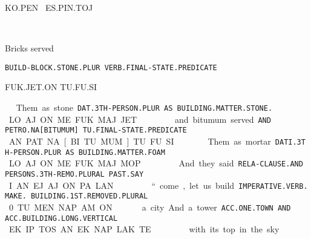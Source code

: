 {KO.PEN~    ES.PIN.TOJ				 

\ko\pen~\es\pin\toj
\drie

Bricks 				served 				 

{\tt BUILD-BLOCK.STONE.PLUR          VERB.FINAL-STATE.PREDICATE	 }

FUK.JET.ON			TU.FU.SI			 

\fuk\jet\on ~ \tu\fu\si
\drie

Them			as 	stone	 

{\tt DAT.3TH-PERSON.PLUR AS	BUILDING.MATTER.STONE. }

LO.AJ.ON		ME	FUK.MAJ.JET 

\lo\aj\on ~ \me ~\fuk\maj\jet
\drie
  

and	bitumum 		served  

{\tt AND	PETRO.NA[BITUMUM]	TU.FINAL-STATE.PREDICATE }

AN	PAT.NA[BI.TU.MUM]	TU.FU.SI 

\an ~ \pat\na\cartouche{\Atlanpi\tu\mum} ~ \tu\fu\si
\drie


  

Them				as 	mortar 

{\tt DATI.3TH-PERSON.PLUR               AS	BUILDING.MATTER.FOAM }

LO.AJ.ON			ME	FUK.MAJ.MOP 

\lo\aj\on ~\me ~\fuk\maj\mop
\drie
  

And 			they 				said  

{\tt RELA-CLAUSE.AND          PERSONS.3TH-REMO.PLURAL 	PAST.SAY }

I.AN			EJ.AJ.ON			PA.LAN 

\Atlani\an ~ \ej\aj\on ~ \pa\lan
\drie

  

“come, let us build                                                                          

{\tt IMPERATIVE.VERB.MAKE. BUILDING.1ST.REMOVED.PLURAL	 }

0.TU.MEN.NAP.AM.ON                                                                              
\Atlano\tu\men\nap\am\on

 

a city			And 	a tower	 

{\tt ACC.ONE.TOWN		AND	ACC.BUILDING.LONG.VERTICAL }

EK.IP.TOS		AN	EK.NAP.LAK.TE	 

\Atlani\an ~ \ej\aj\on ~ \pa\lan
\drie

 

with its top 				in           the sky 

}
